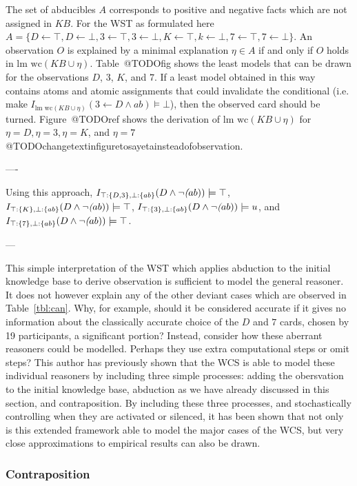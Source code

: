 The set of abducibles $A$ corresponds to positive and negative facts which are not assigned in $KB$. For the WST as formulated here $A=\{D\leftarrow \top,D\leftarrow \bot,3\leftarrow \top,3\leftarrow \bot,K\leftarrow \top,k\leftarrow \bot,7\leftarrow \top,7\leftarrow \bot\}$.
 An observation $O$ is explained by a minimal explanation $\eta \in A$ if and only if $O$ holds in $\textrm{lm wc}(KB\cup\eta)$. Table~@TODOfig shows the least models that can be drawn for the observations $D$, $3$, $K$, and $7$. If a least model obtained in this way contains atoms and atomic assignments that could invalidate the conditional (i.e. make $I_{\textrm{lm wc}(KB\cup \eta)}(3\leftarrow D \land ab)\models \bot$), then the observed card should be turned. Figure~@TODOref shows the derivation of $\textrm{lm wc}(KB\cup \eta)$ for $\eta=D, \eta=3, \eta=K$, and $\eta=7$ @TODOchangetextinfiguretosayetainsteadofobservation.

----

Using this approach, $I_{\top:\{D,3\},\bot:\{ab\}}(D \land \lnot \textit(ab))\models \top$, $I_{\top:\{K\},\bot:\{ab\}}(D \land \lnot \textit(ab))\models \top$, $I_{\top:\{3\},\bot:\{ab\}}(D \land \lnot \textit(ab))\models u$, and $I_{\top:\{7\},\bot:\{ab\}}(D \land \lnot \textit(ab))\models \top$. 

---


This simple interpretation of the WST which applies abduction to the initial knowledge base to derive observation is sufficient to model the general reasoner. It does not however explain any of the other deviant cases which are observed in Table~\ref{tbl:can}. Why, for example, should it be considered accurate if it gives no information about the classically accurate choice of the $D$ and $7$ cards, chosen by 19 participants, a significant portion? Instead, consider how these aberrant reasoners could be modelled. Perhaps they use extra computational steps or omit steps? This author has previously shown that the WCS is able to model these individual reasoners \citep{breu2019weak} by including three simple processes: adding the obersvation to the initial knowledge base, abduction as we have already discussed in this section, and contraposition. By including these three processes, and stochastically controlling when they are activated or silenced, it has been shown that not only is this extended framework able to model the major cases of the WCS, but very close approximations to empirical results can also be drawn.

\subsubsection*{Contraposition}

